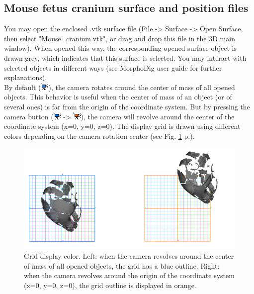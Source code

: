 \documentclass[12pt, a4paper]{book}
\begin{document}
\subsection{Mouse fetus cranium surface and position files}
	You may open the enclosed .vtk surface file (File -> Surface -> Open Surface, then select "Mouse\_cranium.vtk", or drag and drop this file in the 3D main window). When opened
this way, the corresponding opened surface object is drawn grey, which indicates that this surface
is selected. You may interact with selected objects in different ways (see MorphoDig user guide for
further explanations).\\

By default (\includegraphics[scale=0.7]{../images/06/camera/move_cam2.png}), the camera rotates around the center of mass of all opened objects. This behavior is useful when the center of mass of an object (or of several ones) is far from the origin of the coordinate system. But by pressing the camera button (\includegraphics[scale=0.7]{../images/06/camera/move_cam2.png} -> \includegraphics[scale=0.7]{../images/06/camera/move_cam.png}), the camera will revolve around the center of the coordinate system (x=0, y=0, z=0).  The display grid is drawn using different colors depending on the camera rotation center (see Fig. \ref{grid_color} p.\pageref{grid_color}).

\begin{figure}
  \centering
  \includegraphics[scale=0.3]{grid.png} 
	\caption{Grid display color.  Left: when the camera revolves around the center of mass of all opened objects, the grid has a blue outline. Right: when the camera revolves around the origin of the coordinate system (x=0, y=0, z=0), the grid outline is displayed in orange.}
\label{grid_color}
 
\end{figure}
\end{document}
